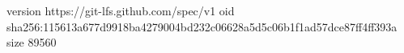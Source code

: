 version https://git-lfs.github.com/spec/v1
oid sha256:115613a677d9918ba4279004bd232c06628a5d5c06b1f1ad57dce87ff4ff393a
size 89560

